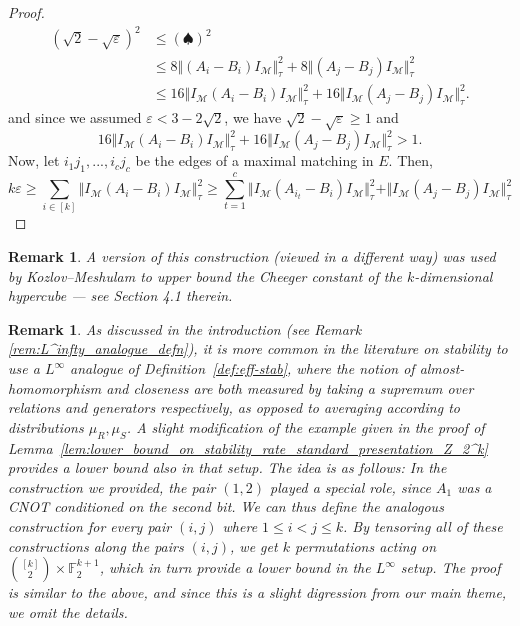 \documentclass[11pt]{article}
\newtheorem{remark}[theorem]{Remark}
\theoremstyle{definition}
\newcommand{\Id}{\ensuremath{I}}
\newcommand{\field}{\mathbb{F}_2}
\newcommand{\mM}{\ensuremath{\mathcal{M}}}
\newcommand{\eps}{\varepsilon}
\begin{document}
\begin{proof}
\begin{align*}
    (\sqrt{2}-\sqrt\eps)^2&\leq (\spadesuit)^2\\
    &\leq 8\Vert(A_i-B_i)\Id_\mM\Vert_\tau^2+8\Vert(A_j-B_j)\Id_\mM\Vert_\tau^2\\
    &\leq 16 \Vert \Id_\mM (A_i-B_i)\Id_\mM\Vert_\tau^2+16 \Vert \Id_\mM (A_j-B_j)\Id_\mM\Vert_\tau^2.
\end{align*}
and since we assumed $\eps<3-2\sqrt{2}$, we have $\sqrt{2}-\sqrt\eps\geq 1$ and 
\[
16 \Vert \Id_\mM (A_i-B_i)\Id_\mM\Vert_\tau^2+16 \Vert \Id_\mM (A_j-B_j)\Id_\mM\Vert_\tau^2> 1.
\]
Now, let $i_1j_1,...,i_cj_c$ be the edges of a maximal  matching in $E$. Then,
\[
k\eps \geq \sum_{i\in [k]}\Vert \Id_\mM (A_i-B_i)\Id_\mM\Vert_\tau^2\geq \sum_{t=1}^c\Vert \Id_\mM (A_{i_t}-B_i)\Id_\mM\Vert_\tau^2+ \Vert \Id_\mM (A_j-B_j)\Id_\mM\Vert_\tau^2
\]
\end{proof}

\begin{remark}
    A version of this construction (viewed in a different way) was used by Kozlov--Meshulam \cite{kozlov2019quantitative} to upper bound the Cheeger constant of the $k$-dimensional hypercube --- see Section 4.1 therein.
\end{remark}

\begin{remark}
As discussed in the introduction (see Remark \ref{rem:L^infty_analogue_defn}), it is more common in the literature on stability to use a $L^\infty$ analogue of Definition~\ref{def:eff-stab}, where the notion of almost-homomorphism and closeness are both measured by taking a supremum over relations and generators respectively, as opposed to averaging according to distributions $\mu_R,\mu_S$. 
A slight modification of the example given in  the proof of Lemma~\ref{lem:lower_bound_on_stability_rate_standard_presentation_Z_2^k} provides a lower bound also in that setup. The idea is as follows: In the construction we provided, the pair $(1,2)$ played a special role, since $A_1$ was a CNOT conditioned on the second bit. We can thus define the analogous construction for every pair $(i,j)$ where $1\leq i<j\leq k$. By tensoring all of these constructions along the pairs $(i,j)$, we get $k$ permutations acting on $\binom{[k]}{2}\times \field^{k+1}$, which in turn provide a lower bound in the $L^\infty$ setup. The proof is similar to the above, and since this is a slight digression from our main theme, we omit the details. 
\end{remark}




\notesendofpaper
\end{document}
